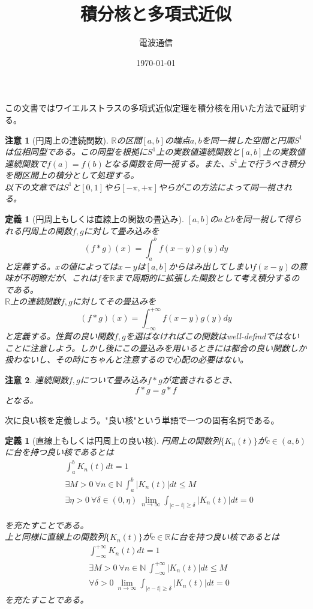\documentclass[leqno]{jsarticle}
\title{積分核と多項式近似}
\author{電波通信}
\date{\today}
\newtheorem{defnition}[theorem]{定義}
\newtheorem*{cau}{注意}
\begin{document}
\maketitle

この文書ではワイエルストラスの多項式近似定理を積分核を用いた方法で証明する。

\begin{cau}[円周上の連続関数]
$\mathbb{R}$の区間$[a,b]$の端点$a,b$を同一視した空間と円周$S^1$は位相同型である。この同型を根拠に$S^1$上の実数値連続関数と$[a,b]$上の実数値連続関数で$f(a)=f(b)$となる関数を同一視する。また、$S^1$上で行うべき積分を閉区間上の積分として処理する。\\ 
以下の文章では$S^1$と$[0,1]$やら$[-\pi,+\pi]$やらがこの方法によって同一視される。
\end{cau}

\begin{defnition}[円周上もしくは直線上の関数の畳込み]
$[a,b]$の$a$と$b$を同一視して得られる円周上の関数$f,g$に対して畳み込みを
 \[
  (f*g)(x)=\int_a^bf(x-y)g(y)dy
 \]と定義する。$x$の値によっては$x-y$は$[a,b]$からはみ出してしまい$f(x-y)$の意味が不明瞭だが、これは$f$を$\mathbb{R}$まで周期的に拡張した関数として考え積分するのである。\\ 
$\mathbb{R}$上の連続関数$f,g$に対してその畳込みを
 \[
  (f*g)(x)=\int_{-\infty}^{+\infty}f(x-y)g(y)dy
\]
と定義する。性質の良い関数$f,g$を選ばなければこの関数はwell-defindではないことに注意しよう。しかし後にこの畳込みを用いるときには都合の良い関数しか扱わないし、その時にちゃんと注意するので心配の必要はない。
\end{defnition}
\begin{cau}
連続関数$f,g$について畳み込み$f*g$が定義されるとき、
\[
f*g=g*f
\]
となる。
\end{cau}

次に良い核を定義しよう。"良い核"という単語で一つの固有名詞である。
\begin{defnition}[直線上もしくは円周上の良い核]円周上の関数列$\{K_n(t)\}$が$c\in(a,b)$に台を持つ良い核であるとは
\begin{eqnarray}
&\int_a^bK_n(t)dt=1\\ 
&\exists M>0\ \forall n\in \mathbb{N}\  \int_a^b |K_n(t)|dt\le M\\ 
&\exists \eta>0\ \forall \delta\in(0,\eta)\ \lim_{n\rightarrow \infty}\int_{|c-t|\ge \delta}|K_n(t)|dt=0
\end{eqnarray}

を充たすことである。\\ 
上と同様に直線上の関数列$\{K_n(t)\}$が$c\in \mathbb{R}$に台を持つ良い核であるとは
\setcounter{equation}{0}
\begin{eqnarray}
&\int_{-\infty}^{+\infty}K_n(t)dt=1\\ 
&\exists M>0\ \forall n\in \mathbb{N}\  \int_{-\infty}^{+\infty}|K_n(t)|dt\le M\\ 
&\forall \delta>0\ \lim_{n\rightarrow \infty}\int_{|c-t|\ge \delta}|K_n(t)|dt=0
\end{eqnarray}
を充たすことである。
\end{defnition}
\end{document}
